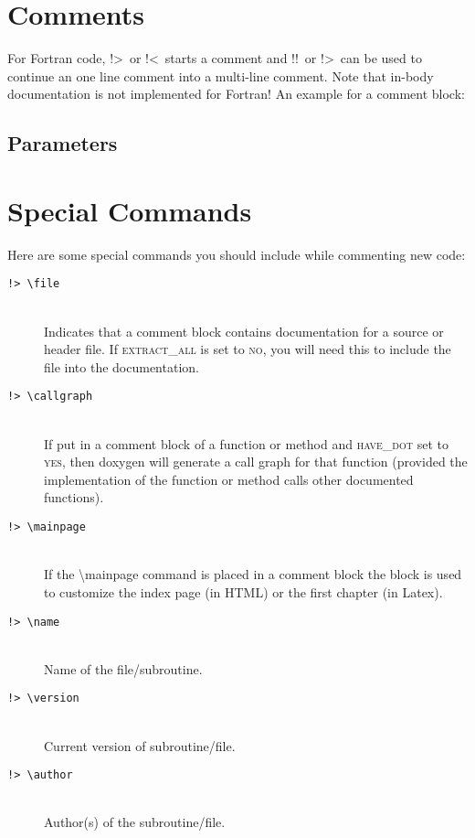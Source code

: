 \documentclass[a4paper,11pt,headsepline]{scrartcl}
\begin{document}
\section{Comments}
For Fortran code, \grqq !>\grqq \ or \grqq !<\grqq \ starts a comment and \grqq !!\grqq \ or \grqq !>\grqq \ can be used to continue an one line comment into a multi-line comment. Note that in-body documentation is not implemented for Fortran! An example for a comment block:

\subsection*{Parameters}

\section{Special Commands} \label{image}
Here are some special commands you should include while commenting new code:
\begin{description}
\item[\texttt{!> \textbackslash file}]\hfill \\
Indicates that a comment block contains documentation for a source or header file. If \textsc{extract\_all} is set to \textsc{no}, you will need this to include the file into the documentation.
\item[\texttt{!> \textbackslash callgraph}]\hfill \\ 
If put in a comment block of a function or method and \textsc{have\_dot} set to \textsc{yes}, then doxygen will generate a call graph for that function (provided the implementation of the function or method calls other documented functions).
\item[\texttt{!> \textbackslash mainpage}]\hfill \\ 
If the \textbackslash mainpage command is placed in a comment block the block is used to customize the index page (in HTML) or the first chapter (in Latex).
\item[\texttt{!> \textbackslash name}]\hfill \\ 
Name of the file/subroutine.
\item[\texttt{!> \textbackslash version}]\hfill \\
Current version of subroutine/file.
\item[\texttt{!> \textbackslash author}]\hfill \\ 
Author(s) of the subroutine/file.
\end{description}
\end{document}
